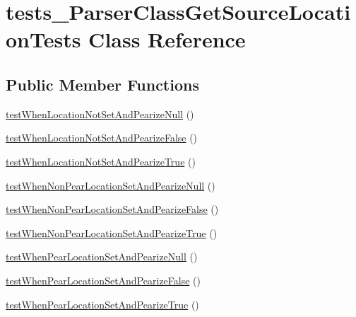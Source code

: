 \hypertarget{classtests___parser_class_get_source_location_tests}{\section{tests\-\_\-\-Parser\-Class\-Get\-Source\-Location\-Tests \-Class \-Reference}
\label{classtests___parser_class_get_source_location_tests}
}
\subsection*{\-Public \-Member \-Functions}
\begin{DoxyCompactItemize}
\item 
\hyperlink{classtests___parser_class_get_source_location_tests_ac721171dfac4984a048e8f71b69d5209}{test\-When\-Location\-Not\-Set\-And\-Pearize\-Null} ()
\item 
\hyperlink{classtests___parser_class_get_source_location_tests_adee1f0a89955b2592f877ae21b1b47b1}{test\-When\-Location\-Not\-Set\-And\-Pearize\-False} ()
\item 
\hyperlink{classtests___parser_class_get_source_location_tests_a053821b7694df0e44f991e7fbce97853}{test\-When\-Location\-Not\-Set\-And\-Pearize\-True} ()
\item 
\hyperlink{classtests___parser_class_get_source_location_tests_ac6de50e08eb4d513dcbe9390221a74dd}{test\-When\-Non\-Pear\-Location\-Set\-And\-Pearize\-Null} ()
\item 
\hyperlink{classtests___parser_class_get_source_location_tests_ad6c809f37460a96ddd5026a5d7420f6c}{test\-When\-Non\-Pear\-Location\-Set\-And\-Pearize\-False} ()
\item 
\hyperlink{classtests___parser_class_get_source_location_tests_a94bfc35295afbf47a5b1eb7883e508c6}{test\-When\-Non\-Pear\-Location\-Set\-And\-Pearize\-True} ()
\item 
\hyperlink{classtests___parser_class_get_source_location_tests_a37e70815dfa80be80feff06e6c9d240e}{test\-When\-Pear\-Location\-Set\-And\-Pearize\-Null} ()
\item 
\hyperlink{classtests___parser_class_get_source_location_tests_a2879e5607d6fef36117472e4d5ae2d31}{test\-When\-Pear\-Location\-Set\-And\-Pearize\-False} ()
\item 
\hyperlink{classtests___parser_class_get_source_location_tests_a79b0eb4fc9a73a3002fcde3654e235ca}{test\-When\-Pear\-Location\-Set\-And\-Pearize\-True} ()
\item 

\end{DoxyCompactItemize}
